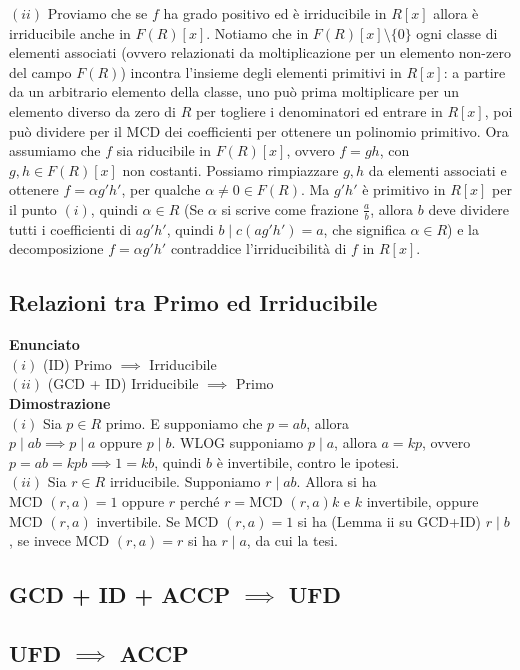 \documentclass[a4paper,GeneralMath,NoNotes]{stdmdoc}
\newcommand{\opp}{\text{ oppure }}
\newcommand{\Enunciato}{\vskip 0.05cm \noindent \textbf{Enunciato} \\ }
\renewcommand{\Dimostrazione}{\vskip 0.05cm \noindent \textbf{Dimostrazione} \\ }
\newcommand{\frdx}{ \framebox[\width]{ $\Rightarrow$ } }
\newcommand{\MCD}{\text{MCD }}
\begin{document}
		$(ii)$ \frdx Proviamo che se $f$ ha grado positivo ed è irriducibile in $R[x]$ allora è irriducibile anche in $F(R)[x]$. Notiamo che in $F(R)[x] \setminus \{0\}$ ogni classe di elementi associati (ovvero relazionati da moltiplicazione per un elemento non-zero del campo $F(R)$) incontra l'insieme degli elementi primitivi in $R[x]$: a partire da un arbitrario elemento della classe, uno può prima moltiplicare per un elemento diverso da zero di $R$ per togliere i denominatori ed entrare in $R[x]$, poi può dividere per il MCD dei coefficienti per ottenere un polinomio primitivo. Ora assumiamo che $f$ sia riducibile in $F(R)[x]$, ovvero $f = gh$, con $g, h \in F(R)[x]$ non costanti. Possiamo rimpiazzare $g, h$ da elementi associati e ottenere $f = \alpha g' h'$, per qualche $\alpha \neq 0 \in F(R)$. Ma $g'h'$ è primitivo in $R[x]$ per il punto $(i)$, quindi $\alpha \in R$ (Se $\alpha$ si scrive come frazione $\frac{a}{b}$, allora $b$ deve dividere tutti i coefficienti di $ag'h'$, quindi $b \mid c(ag'h') = a$, che significa $\alpha \in R$) e la decomposizione $f = \alpha g'h'$ contraddice l'irriducibilità di $f$ in $R[x]$.

	\subsection{Relazioni tra Primo ed Irriducibile}
	\Enunciato
		$(i)$ (ID) Primo $\implies$ Irriducibile \\
		$(ii)$ (GCD + ID) Irriducibile $\implies$ Primo \\
	\Dimostrazione
		$(i)$ Sia $p \in R$ primo. E supponiamo che $p = ab$, allora $p \mid ab \implies p \mid a \opp p \mid b$. WLOG supponiamo $p \mid a$, allora $a = kp$, ovvero $p = ab = kpb \implies 1 = kb$, quindi $b$ è invertibile, contro le ipotesi. \\
		$(ii)$ Sia $r \in R$ irriducibile. Supponiamo $r \mid ab$. Allora si ha $\MCD(r,a) = 1 \opp r$ perché $r = \MCD(r,a) k$ e $k$ invertibile, oppure $\MCD(r,a)$ invertibile. Se $\MCD(r,a) = 1$ si ha (Lemma ii su GCD+ID) $r \mid b$, se invece $\MCD(r,a) = r$ si ha $r \mid a$, da cui la tesi. \\

	\subsection{GCD + ID + ACCP $\implies$ UFD}

	\subsection{UFD $\implies$ ACCP}
\end{document}
